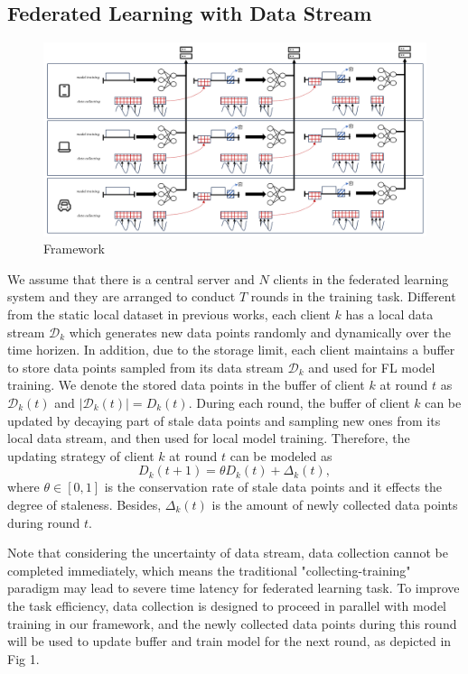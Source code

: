 \documentclass{article}
\theoremstyle{plain}
\theoremstyle{definition}
\theoremstyle{remark}
\begin{document}
\subsection{Federated Learning with Data Stream}
\begin{figure}[ht]
  \centering
  \includegraphics[width=\columnwidth]{figures/figure_21.png}
  \caption{Framework}
\end{figure}
We assume that there is a central server and $N$ clients in the federated learning system and they are arranged to conduct $T$ rounds in the training task. Different from the static local dataset in previous works, each client $k$ has a local data stream $\mathcal{D}_k$ which generates new data points randomly and dynamically over the time horizen.
In addition, due to the storage limit, each client maintains a buffer to store data points sampled from its data stream $\mathcal{D}_k$ and used for FL model training.
We denote the stored data points in the buffer of client $k$ at round $t$ as $\mathcal{D}_k(t)$ and $\vert\mathcal{D}_k(t)\vert = D_k(t)$. 
During each round, the buffer of client $k$ can be updated by decaying part of stale data points and sampling new ones from its local data stream, and then used for local model training.
Therefore, the updating strategy of client $k$ at round $t$ can be modeled as
\begin{equation}
  D_k(t+1) = \theta D_k(t) + \Delta_k(t),
\end{equation}
where $\theta \in [0,1]$ is the conservation rate of stale data points and it effects the degree of staleness. 
Besides, $\Delta_k(t)$ is the amount of newly collected data points during round $t$.

Note that considering the uncertainty of data stream, data collection cannot be completed immediately, which means the traditional "collecting-training" paradigm may lead to severe time latency for federated learning task.
To improve the task efficiency, data collection is designed to proceed in parallel with model training in our framework, and the newly collected data points during this round will be used to update buffer and train model for the next round, as depicted in Fig 1.
\end{document}
